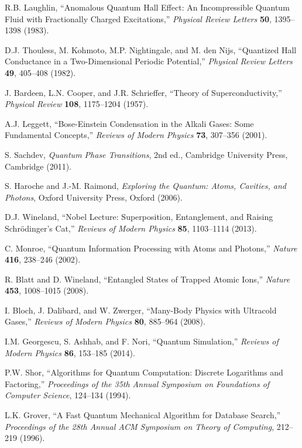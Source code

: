\documentclass[11pt]{article}
\theoremstyle{plain}
\theoremstyle{definition}
\theoremstyle{remark}
\begin{document}
\begin{thebibliography}{99}
 R.B. Laughlin, ``Anomalous Quantum Hall Effect: An Incompressible Quantum Fluid with Fractionally Charged Excitations,'' \emph{Physical Review Letters} \textbf{50}, 1395--1398 (1983).

 D.J. Thouless, M. Kohmoto, M.P. Nightingale, and M. den Nijs, ``Quantized Hall Conductance in a Two-Dimensional Periodic Potential,'' \emph{Physical Review Letters} \textbf{49}, 405--408 (1982).

 J. Bardeen, L.N. Cooper, and J.R. Schrieffer, ``Theory of Superconductivity,'' \emph{Physical Review} \textbf{108}, 1175--1204 (1957).

 A.J. Leggett, ``Bose-Einstein Condensation in the Alkali Gases: Some Fundamental Concepts,'' \emph{Reviews of Modern Physics} \textbf{73}, 307--356 (2001).

 S. Sachdev, \emph{Quantum Phase Transitions}, 2nd ed., Cambridge University Press, Cambridge (2011).

 S. Haroche and J.-M. Raimond, \emph{Exploring the Quantum: Atoms, Cavities, and Photons}, Oxford University Press, Oxford (2006).

 D.J. Wineland, ``Nobel Lecture: Superposition, Entanglement, and Raising Schrödinger's Cat,'' \emph{Reviews of Modern Physics} \textbf{85}, 1103--1114 (2013).

 C. Monroe, ``Quantum Information Processing with Atoms and Photons,'' \emph{Nature} \textbf{416}, 238--246 (2002).

 R. Blatt and D. Wineland, ``Entangled States of Trapped Atomic Ions,'' \emph{Nature} \textbf{453}, 1008--1015 (2008).

 I. Bloch, J. Dalibard, and W. Zwerger, ``Many-Body Physics with Ultracold Gases,'' \emph{Reviews of Modern Physics} \textbf{80}, 885--964 (2008).

 I.M. Georgescu, S. Ashhab, and F. Nori, ``Quantum Simulation,'' \emph{Reviews of Modern Physics} \textbf{86}, 153--185 (2014).

 P.W. Shor, ``Algorithms for Quantum Computation: Discrete Logarithms and Factoring,'' \emph{Proceedings of the 35th Annual Symposium on Foundations of Computer Science}, 124--134 (1994).

 L.K. Grover, ``A Fast Quantum Mechanical Algorithm for Database Search,'' \emph{Proceedings of the 28th Annual ACM Symposium on Theory of Computing}, 212--219 (1996).


\end{thebibliography}
\end{document}
